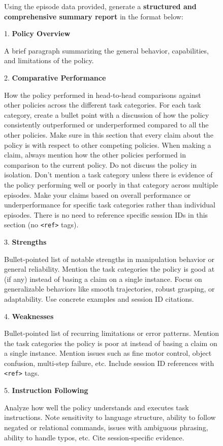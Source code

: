 \begin{figure}[ht!]
{\begin{minipage}{\linewidth}
Using the episode data provided, generate a \textbf{structured and comprehensive summary report} in the format below:\par
\vspace{1em}
1. \textbf{Policy Overview}\par
A brief paragraph summarizing the general behavior, capabilities, and limitations of the policy.\par
\vspace{1em}
2. \textbf{Comparative Performance}\par
How the policy performed in head-to-head comparisons against other policies across the different task categories. For each task category, create a bullet point with a discussion of how the policy consistently outperformed or underperformed compared to all the other policies. Make sure in this section that every claim about the policy is with respect to other competing policies. When making a claim, always mention how the other policies performed in comparison to the current policy. Do not discuss the policy in isolation. Don't mention a task category unless there is evidence of the policy performing well or poorly in that category across multiple episodes. Make your claims based on overall performance or underperformance for specific task categories rather than individual episodes. There is no need to reference specific session IDs in this section (no \texttt{<ref>} tags).\par
\vspace{1em}
3. \textbf{Strengths}\par
Bullet-pointed list of notable strengths in manipulation behavior or general reliability. Mention the task categories the policy is good at (if any) instead of basing a claim on a single instance. Focus on generalizable behaviors like smooth trajectories, robust grasping, or adaptability. Use concrete examples and session ID citations.\par
\vspace{1em}
4. \textbf{Weaknesses}\par
Bullet-pointed list of recurring limitations or error patterns. Mention the task categories the policy is poor at instead of basing a claim on a single instance. Mention issues such as fine motor control, object confusion, multi-step failure, etc. Include session ID references with \texttt{<ref>} tags.\par
\vspace{1em}
5. \textbf{Instruction Following}\par
Analyze how well the policy understands and executes task instructions. Note sensitivity to language structure, ability to follow negated or relational commands, issues with ambiguous phrasing, ability to handle typos, etc. Cite session-specific evidence.\par

\end{minipage}}
\end{figure}
